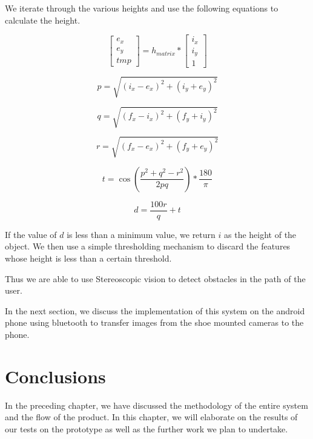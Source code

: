\documentclass[11pt]{report}
\begin{document}
We iterate through the various heights and use the following equations to calculate the height. 

\begin{equation}
\begin{bmatrix}
e_x \\ e_y \\ tmp 
\end{bmatrix}
= h_{matrix} * \begin{bmatrix}
i_x \\ i_y \\ 1
\end{bmatrix}
\end{equation} 

\begin{equation}
p = \sqrt{(i_x - e_x)^2 + (i_y + e_y)^2}
\end{equation} 

\begin{equation}
q = \sqrt{(f_x - i_x)^2 + (f_y + i_y)^2}
\end{equation} 

\begin{equation}
r = \sqrt{(f_x - e_x)^2 + (f_y + e_y)^2}
\end{equation} 

\begin{equation}
t = \cos(\frac{p^2+q^2-r^2}{2pq}) *\frac{180}{\pi}
\end{equation} 

\begin{equation}
d= \frac{100r}{q} + t
\end{equation}

If the value of $d$ is less than a minimum value, we return $i$ as the height of the object. We then use a simple thresholding mechanism to discard the features whose height is less than a certain threshold.

Thus we are able to use Stereoscopic vision to detect obstacles in the path of the user.

In the next section, we discuss the implementation of this system on the android phone using bluetooth to transfer images from the shoe mounted cameras to the phone.


\chapter{Conclusions}

In the preceding chapter, we have discussed the methodology of the entire system and the flow of the product. In this chapter, we will elaborate on the results of our tests on the prototype as well as the further work we plan to undertake. 



    



\end{document}
